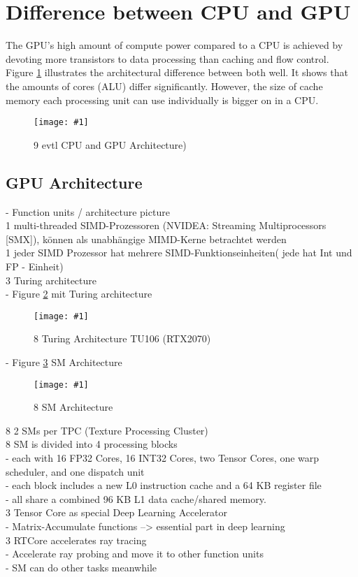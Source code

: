 \documentclass[a4paper,12pt]{llncs}
\numberwithin{equation}{section}
\newcommand{\bildbreite}[5]{
  \begin{figure}[htbp]
    \begin{center}
      \texttt{[image: \#1]}
      \caption[#5]{#4}
      \label{#3}
    \end{center}
  \end{figure}
}
\begin{document}
\section{Difference between CPU and GPU}

  
  The GPU's high amount of compute power compared to a CPU is achieved by devoting more transistors to data processing than caching and flow control.~\cite{NVIDIA.2019}
  Figure \ref{fig:GPU_CPU_Arc} illustrates the architectural difference between both well.
  It shows that the amounts of cores (ALU) differ significantly.
  However, the size of cache memory each processing unit can use individually is bigger on in a CPU.
  \bildbreite{figures/CPU_GPU_Arc.JPG}{9cm}{fig:GPU_CPU_Arc}{9 evtl CPU and GPU Architecture)}{}
  
  
\subsection{GPU Architecture}
    - Function units / architecture picture\\
      1 multi-threaded SIMD-Prozessoren (NVIDEA: Streaming Multiprocessors [SMX]), können als unabhängige MIMD-Kerne betrachtet werden\\
      1 jeder SIMD Prozessor hat mehrere SIMD-Funktionseinheiten( jede hat Int und FP - Einheit)\\
	  3 Turing architecture\\
	  - Figure \ref{fig:turingOverall} mit Turing architecture\\
	  \bildbreite{figures/Turing_architecture.JPG}{6cm}{fig:turingOverall}{8 Turing Architecture TU106 (RTX2070)}{}
	  - Figure \ref{fig:smArch} SM Architecture\\
	  \bildbreite{figures/SM_arch.jpg}{4cm}{fig:smArch}{8 SM Architecture}{}
	  8 2 SMs per TPC (Texture Processing Cluster)\\
	  8 SM is divided into 4 processing blocks\\
	    - each with 16 FP32 Cores, 16 INT32 Cores, two Tensor Cores, one warp scheduler, and one dispatch unit\\
	    - each block includes a new L0 instruction cache and a 64 KB register file\\
	    - all share a combined 96 KB L1 data cache/shared memory.\\

	  3 Tensor Core as special Deep Learning Accelerator\\
	    - Matrix-Accumulate functions --> essential part in deep learning\\
	  3 RTCore accelerates ray tracing\\
	    - Accelerate ray probing and move it to other function units\\
	    - SM can do other tasks meanwhile\\
	  
\end{document}
